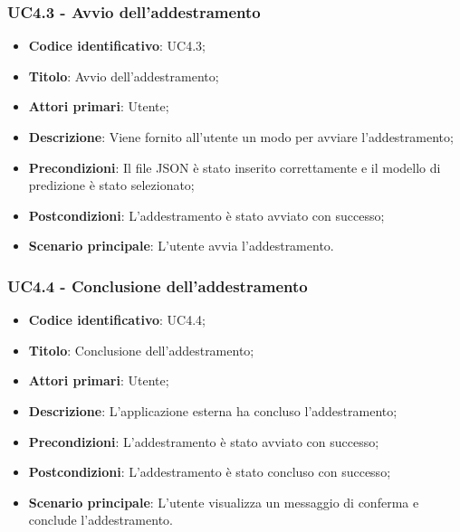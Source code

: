 \subsubsection{UC4.3 - Avvio dell'addestramento}
\begin{itemize}
    \item \textbf{Codice identificativo}: UC4.3;
    \item \textbf{Titolo}: Avvio dell'addestramento;
    \item \textbf{Attori primari}: Utente;
    \item \textbf{Descrizione}: Viene fornito all'utente un modo per avviare l'addestramento;
    \item \textbf{Precondizioni}: Il file JSON è stato inserito correttamente e il modello di predizione è stato selezionato;
    \item \textbf{Postcondizioni}: L'addestramento è stato avviato con successo;
    \item \textbf{Scenario principale}: L'utente avvia l'addestramento.
\end{itemize}

\subsubsection{UC4.4 - Conclusione dell'addestramento}
\begin{itemize}
    \item \textbf{Codice identificativo}: UC4.4;
    \item \textbf{Titolo}: Conclusione dell'addestramento;
    \item \textbf{Attori primari}: Utente;
    \item \textbf{Descrizione}: L'applicazione esterna ha concluso l'addestramento;
    \item \textbf{Precondizioni}: L'addestramento è stato avviato con successo;
    \item \textbf{Postcondizioni}: L'addestramento è stato concluso con successo;
    \item \textbf{Scenario principale}: L'utente visualizza un messaggio di conferma e conclude l'addestramento.
\end{itemize}


